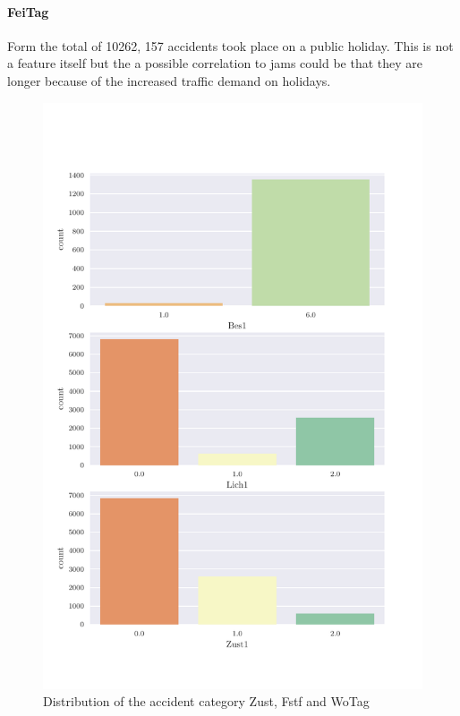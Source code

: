 \paragraph{FeiTag}
Form the total of 10262, 157 accidents took place on a public holiday. This is not a feature itself but the a possible correlation to jams could be that they are longer because of the increased traffic demand on holidays.

\clearpage
\begin{figure}[!ht]
	\centering
	\includegraphics[scale=0.7, trim=0cm 1.5cm 0cm 1cm]{CorrAnalysis/data/BAYSIS/01_dataset/plots/baysis_dataset_count_multiple04}
	\caption{Distribution of the accident category Zust, Fstf and WoTag}
	\label{img:baysis_dataset_Zust_Fstf_WoTag}
\end{figure}
\clearpage
	

